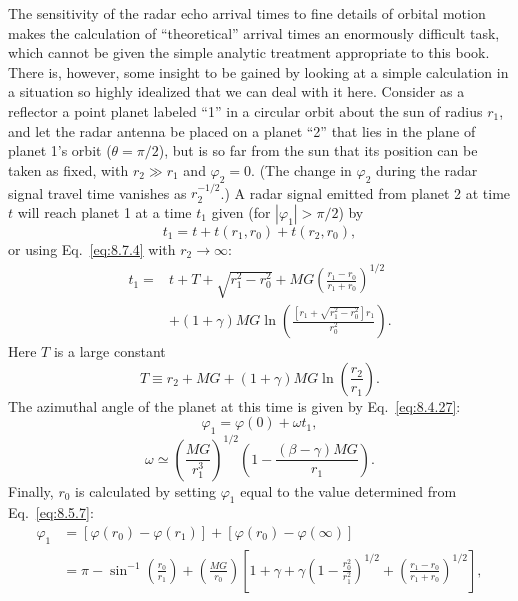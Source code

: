 The sensitivity of the radar echo arrival times to fine details of orbital
motion makes the calculation of ``theoretical'' arrival times an enormously
difficult task, which cannot be given the simple analytic treatment
appropriate to this book. There is, however, some insight to be gained by
looking at a simple calculation in a situation so highly idealized that we
can deal with it here. Consider as a reflector a point planet labeled ``1''
in a circular orbit about the sun of radius \(r_1\), and let the radar
antenna be placed on a planet ``2'' that lies in the plane of planet 1's
orbit (\(\theta=\pi/2\)), but is so far from the sun that its position can
be taken as fixed, with \(r_2\gg r_1\) and \(\varphi_2=0\). (The change in
\(\varphi_2\) during the radar signal travel time vanishes as
\(r_2^{-1/2}\).) A radar signal emitted from planet 2 at time \(t\) will
reach planet 1 at a time \(t_1\) given (for
\(|\varphi_1|>\pi/2\)) by
\[
  t_1=t+t(r_1,r_0)+t(r_2,r_0),
\]
or using Eq.~\eqref{eq:8.7.4} with \(r_2\to\infty\):
\begin{equation}
  \begin{split}
  t_1
  ={}&t+T+\sqrt{r_1^2-r_0^2}
  +MG\left(\frac{r_1-r_0}{r_1+r_0}\right)^{1/2}\\
  &+(1+\gamma)MG
  \ln\left(
    \frac{\left[r_1+\sqrt{r_1^2-r_0^2}\right]r_1}{r_0^2}
  \right).
  \end{split}
  \tag{8.7.8}\label{eq:8.7.8}
\end{equation}
Here \(T\) is a large constant
\begin{equation}
  T\equiv r_2+MG+(1+\gamma)MG\ln\left(\frac{r_2}{r_1}\right).
  \tag{8.7.9}\label{eq:8.7.9}
\end{equation}
The azimuthal angle of the planet at this time is given by
Eq.~\eqref{eq:8.4.27}:
\begin{equation}
  \varphi_1=\varphi(0)+\omega t_1,
  \tag{8.7.10}\label{eq:8.7.10}
\end{equation}
\begin{equation}
  \omega
  \simeq
  \left(\frac{MG}{r_1^3}\right)^{1/2}
  \left(1-\frac{(\beta-\gamma)MG}{r_1}\right).
  \tag{8.7.11}\label{eq:8.7.11}
\end{equation}
Finally, \(r_0\) is calculated by setting \(\varphi_1\) equal to the value
determined from Eq.~\eqref{eq:8.5.7}:
\[
  \begin{split}
  \varphi_1
  &=
  [\varphi(r_0)-\varphi(r_1)]
  +[\varphi(r_0)-\varphi(\infty)]\\
  &=
  \pi-\sin^{-1}\left(\frac{r_0}{r_1}\right)
  +\left(\frac{MG}{r_0}\right)
  \left[
    1+\gamma
    +\gamma\left(1-\frac{r_0^2}{r_1^2}\right)^{1/2}
    +\left(\frac{r_1-r_0}{r_1+r_0}\right)^{1/2}
  \right],
  \end{split}
\]
